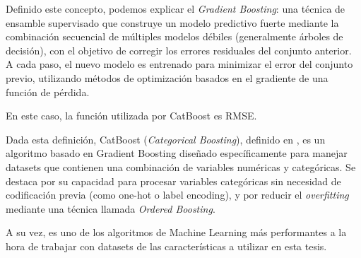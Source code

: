 Definido este concepto, podemos explicar el \emph{Gradient Boosting}: una técnica de ensamble supervisado que construye un modelo predictivo fuerte mediante la combinación secuencial de múltiples modelos débiles (generalmente árboles de decisión), con el objetivo de corregir los errores residuales del conjunto anterior. A cada paso, el nuevo modelo es entrenado para minimizar el error del conjunto previo, utilizando métodos de optimización basados en el gradiente de una función de pérdida.

En este caso, la función utilizada por CatBoost es RMSE.

Dada esta definición, CatBoost (\emph{Categorical Boosting}), definido en \parencite{dorogush2018catboost}, es un algoritmo basado en Gradient Boosting diseñado específicamente para manejar datasets que contienen una combinación de variables numéricas y categóricas. Se destaca por su capacidad para procesar variables categóricas sin necesidad de codificación previa (como one-hot o label encoding), y por reducir el \emph{overfitting} mediante una técnica llamada \emph{Ordered Boosting}. 

A su vez, es uno de los algoritmos de Machine Learning más performantes a la hora de trabajar con datasets de las características a utilizar en esta tesis.
